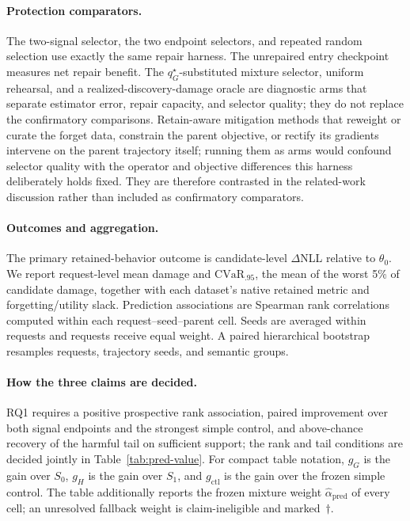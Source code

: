 \paragraph{Protection comparators.}
The two-signal selector, the two endpoint selectors, and repeated random
selection use exactly the same repair harness. The unrepaired entry checkpoint
measures net repair benefit. The $q_G^\star$-substituted mixture selector,
uniform rehearsal, and a
realized-discovery-damage oracle are diagnostic arms that separate estimator
error, repair capacity, and selector quality; they do not replace the
confirmatory comparisons.
Retain-aware mitigation methods that reweight or curate the forget data,
constrain the parent objective, or rectify its gradients intervene on the
parent trajectory itself; running them as arms would confound selector quality
with the operator and objective differences this harness deliberately holds
fixed. They are therefore contrasted in the related-work discussion rather
than included as confirmatory comparators.

\paragraph{Outcomes and aggregation.}
The primary retained-behavior outcome is candidate-level $\Delta$NLL relative
to $\theta_0$. We report request-level mean damage and
$\mathrm{CVaR}_{.95}$, the mean of the worst 5\% of candidate damage, together
with each dataset's native retained metric and forgetting/utility slack.
Prediction associations are Spearman rank correlations computed within each
request--seed--parent cell. Seeds are averaged within requests and requests
receive equal weight. A paired hierarchical bootstrap resamples requests,
trajectory seeds, and semantic groups.

\paragraph{How the three claims are decided.}
RQ1 requires a positive prospective rank association, paired improvement over
both signal endpoints and the strongest simple control, and above-chance
recovery of the harmful tail on sufficient support; the rank and tail
conditions are decided jointly in Table~\ref{tab:pred-value}. For compact
table notation, $g_G$ is the gain over $S_0$, $g_H$ is the gain over $S_1$,
and $g_{\mathrm{ctl}}$ is the gain over the frozen simple control. The table
additionally reports the frozen mixture weight
$\widehat\alpha_{\mathrm{pred}}$ of every cell; an unresolved fallback weight
is claim-ineligible and marked~$\dagger$.

